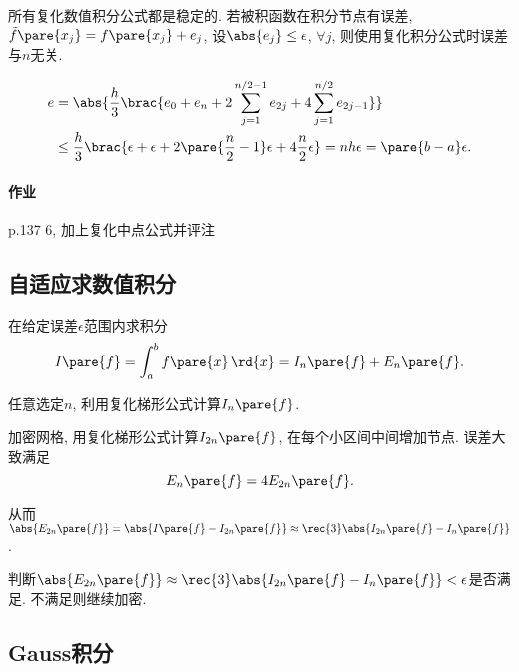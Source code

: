 \documentclass[hidelinks]{ctexart}
\begin{document}
所有复化数值积分公式都是稳定的. 若被积函数在积分节点有误差, $\tilde{f}\pare{x_j} = f\pare{x_j} + e_j$, 设$\abs{e_j} \le \epsilon$, $\forall j$, 则使用复化积分公式时误差与$n$无关.

\begin{align*}
    e &= \abs{\frac{h}{3}\brac{e_0 + e_n + 2\sum_{j=1}^{n/2-1} e_{2j} + 4\sum_{j=1}^{n/2} e_{2j-1}}} \\
    & \le \frac{h}{3}\brac{\epsilon + \epsilon + 2\pare{\frac{n}{2} - 1}\epsilon + 4\frac{n}{2}\epsilon} = nh\epsilon = \pare{b-a}\epsilon.
\end{align*}

\paragraph{作业} %
\label{par:作业}

p.137 6, 加上复化中点公式并评注




\subsection{自适应求数值积分} %
\label{sub:自适应求数值积分}

在给定误差$\epsilon$范围内求积分
\[ I\pare{f} = \int_a^b f\pare{x}\,\rd{x} = I_n\pare{f}+E_n\pare{f}. \]
\begin{cenum}
    \item 任意选定$n$, 利用复化梯形公式计算$I_n\pare{f}$.
    \item 加密网格, 用复化梯形公式计算$I_{2n}\pare{f}$, 在每个小区间中间增加节点. 误差大致满足
    \[ E_n\pare{f} = 4E_{2n}\pare{f}. \]
    \item 从而$\displaystyle \abs{E_{2n}\pare{f}} = \abs{I\pare{f} - I_{2n}\pare{f}} \approx \rec{3}\abs{I_{2n}\pare{f} - I_n\pare{f}}$.
    \item 判断$\displaystyle \abs{E_{2n}\pare{f}} \approx \rec{3}\abs{I_{2n}\pare{f} - I_n\pare{f}} < \epsilon$是否满足. 不满足则继续加密.
\end{cenum}


\subsection{Gauss积分} %
\label{sub:gauss积分}
\end{document}
